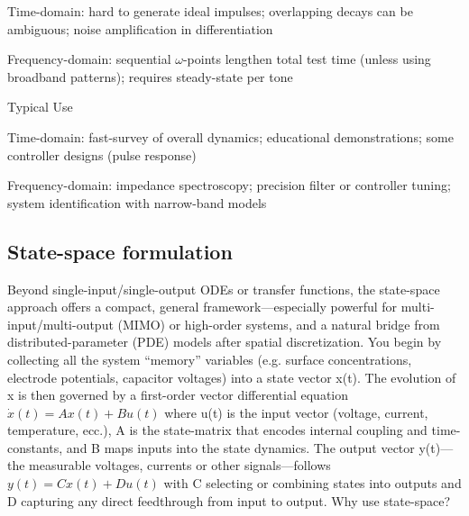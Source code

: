 Time-domain: hard to generate ideal impulses; overlapping decays can be ambiguous; noise amplification in differentiation

Frequency-domain: sequential $\omega$-points lengthen total test time (unless using broadband patterns); requires steady-state per tone

Typical Use

Time-domain: fast-survey of overall dynamics; educational demonstrations; some controller designs (pulse response)

Frequency-domain: impedance spectroscopy; precision filter or controller tuning; system identification with narrow-band models

\subsection{State-space formulation}
Beyond single-input/single-output ODEs or transfer functions, the state-space approach offers a compact, general framework—especially powerful for multi-input/multi-output (MIMO) or high-order systems, and a natural bridge from distributed-parameter (PDE) models after spatial discretization. You begin by collecting all the system “memory” variables (e.g. surface concentrations, electrode potentials, capacitor voltages) into a state vector x(t). The evolution of x is then governed by a first-order vector differential equation 
$\dot{x}(t) = Ax(t) + B u(t)$
where u(t) is the input vector (voltage, current, temperature, ecc.), A is the state-matrix that encodes internal coupling and time-constants, and B maps inputs into the state dynamics. The output vector y(t)—the measurable voltages, currents or other signals—follows 
$y(t)=Cx(t)+Du(t)$
with C selecting or combining states into outputs and D capturing any direct feedthrough from input to output. Why use state-space?
